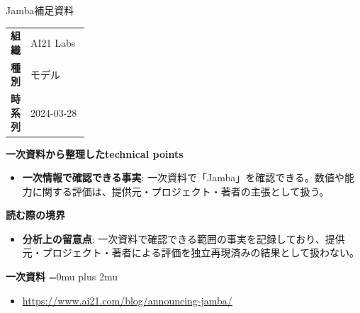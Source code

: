 \begin{technicalnote}{Jamba}{補足資料}
\begingroup
\begin{tabularx}{\linewidth}{@{}>{\bfseries}p{0.22\linewidth}X@{}}
組織 & AI21 Labs \\
種別 & モデル \\
時系列 & 2024-03-28 \\
\end{tabularx}
\smallskip
{\bfseries 一次資料から整理したtechnical points}
\begin{itemize}[leftmargin=1.5em,itemsep=0.35em]
\item \textbf{一次情報で確認できる事実}: 一次資料で「Jamba」を確認できる。数値や能力に関する評価は、提供元・プロジェクト・著者の主張として扱う。
\end{itemize}
\begin{minipage}{\linewidth}
{\bfseries 読む際の境界}
\begin{itemize}[leftmargin=1.5em,itemsep=0.35em]
\item \textbf{分析上の留意点}: 一次資料で確認できる範囲の事実を記録しており、提供元・プロジェクト・著者による評価を独立再現済みの結果として扱わない。
\end{itemize}
\begin{samepage}
{\bfseries 一次資料}
\begingroup\sloppy
\Urlmuskip=0mu plus 2mu\relax
\begin{itemize}[leftmargin=1.5em,itemsep=0.25em]
\item {\scriptsize\url{https://www.ai21.com/blog/announcing-jamba/}}
\end{itemize}
\endgroup
\end{samepage}
\end{minipage}
\endgroup
\end{technicalnote}
\medskip

